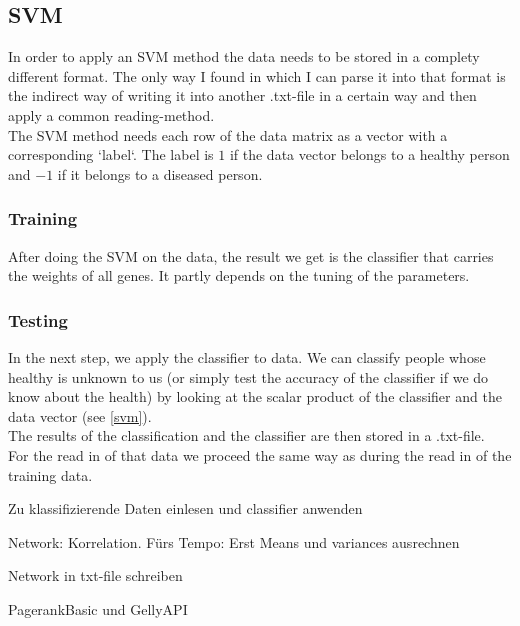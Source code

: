 \documentclass{bioinfo}
\begin{document}
\subsection{SVM}
In order to apply an SVM method the data needs to be stored in a complety different format. The only way I found in which I can parse it into that format is the indirect way of writing it into another .txt-file in a certain way and then apply a common reading-method.\\
The SVM method needs each row of the data matrix as a vector with a corresponding `label`. The label is $1$ if the data vector belongs to a healthy person and $-1$ if it belongs to a diseased person.\\
\subsubsection{Training}
After doing the SVM on the data, the result we get is the classifier that carries the weights of all genes. It partly depends on the tuning of the parameters.
\subsubsection{Testing}
In the next step, we apply the classifier to data. We can classify people whose healthy is unknown to us (or simply test the accuracy of the classifier if we do know about the health) by looking at the scalar product of the classifier and the data vector (see \ref{svm}).\\
The results of the classification and the classifier are then stored in a .txt-file.\\
For the read in of that data we proceed the same way as during the read in of the training data.


    Zu klassifizierende Daten einlesen und classifier anwenden 

    Network: Korrelation. Fürs Tempo: Erst Means und variances ausrechnen 

    Network in txt-file schreiben 

    PagerankBasic und GellyAPI 

     
\end{document}
